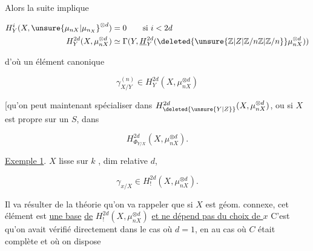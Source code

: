 Alors la suite  implique

\[
\begin{aligned}
H^i_Y(X,\unsure{\mu_{nX}|\mu_{n_X}}^{\otimes d})&=0\qquad\text{si }i<2d\\
H^{2d}_Y(X,\mu_{nX}^{\otimes d})&\simeq\Gamma(Y,\underline H^{2d}_Y(\deleted{\unsure{\mathbb Z|Z|\mathbb Z/n\mathbb Z|\mathbb Z/n}}\mu_{nX}^{\otimes d}))
\end{aligned}
\]

d'où un  élément canonique

\[
\gamma^{(n)}_{X/Y}\in H^{2d}_Y(X,\mu_{nX}^{\otimes d})
\]

[qu'on peut maintenant spécialiser dans $H^{2d}_{\deleted{\unsure{Y|Z}}}(X,\mu_{nX}^{\otimes d})$, ou si $X$ est propre sur un $S$, dans

\[
H^{2d}_{\Phi_{Y/X}}(X,\mu_{nX}^{\otimes d}).
\]



\uline{Exemple 1}. $X$ lisse sur $k$ ,  dim relative $d$,  

\[
\gamma_{x/X}\in H^{2d}_!(X,\mu_{nX}^{\otimes d}).
\]

Il va résulter de la théorie qu'on va rappeler que  si $X$ est géom. connexe, cet élément est \uline{une base} \uline{de} $H^{2d}_!(X,\mu_{nX}^{\otimes d})$ \uline{et ne dépend pas du choix de $x$}  C'est qu'on avait vérifié directement dans le cas où $d=1$, en  au cas où $C$ était complète et où on dispose 

